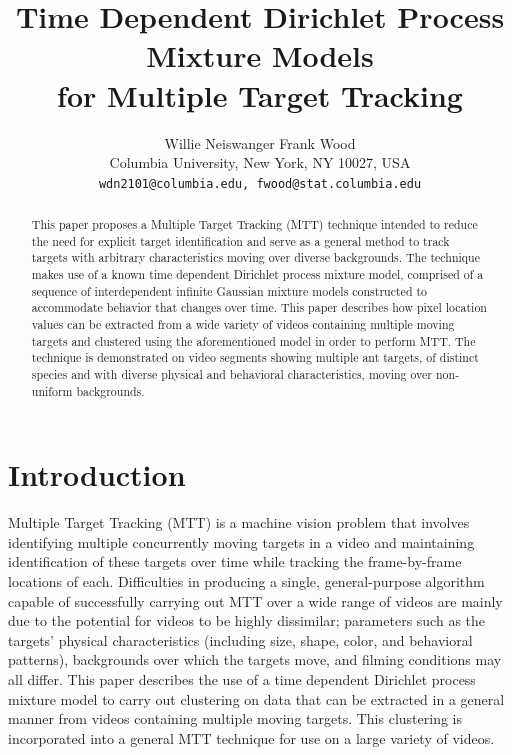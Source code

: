 \documentclass{article}
\title{\large{Time Dependent Dirichlet Process Mixture Models\\ for Multiple Target Tracking}}
\author{
Willie Neiswanger \hspace{1cm} Frank Wood\\
Columbia University, New York, NY 10027, USA \\
\texttt{wdn2101@columbia.edu, fwood@stat.columbia.edu}
}
\begin{document}
\maketitle







\begin{abstract}
This paper proposes a Multiple Target Tracking (MTT) technique intended to reduce the need for explicit target identification and serve as a general method to track targets with arbitrary characteristics moving over diverse backgrounds. The technique makes use of a known time dependent Dirichlet process mixture model, comprised of a sequence of interdependent infinite Gaussian mixture models constructed to accommodate behavior that changes over time. This paper describes how pixel location values can be extracted from a wide variety of videos containing multiple moving targets and clustered using the aforementioned model in order to perform MTT. The technique is demonstrated on video segments showing multiple ant targets, of distinct species and with diverse physical and behavioral characteristics, moving over non-uniform backgrounds.
\end{abstract}







\section{Introduction}
\label{sec:introduction}

Multiple Target Tracking (MTT) is a machine vision problem that involves identifying multiple concurrently moving targets in a video and maintaining identification of these targets over time while tracking the frame-by-frame locations of each. Difficulties in producing a single, general-purpose algorithm capable of successfully carrying out MTT over a wide range of videos are mainly due to the potential for videos to be highly dissimilar; parameters such as the targets' physical characteristics (including size, shape, color, and behavioral patterns), backgrounds over which the targets move, and filming conditions may all differ. This paper describes the use of a time dependent Dirichlet process mixture model to carry out clustering on data that can be extracted in a general manner from videos containing multiple moving targets. This clustering is incorporated into a general MTT technique for use on a large variety of videos.
\end{document}

